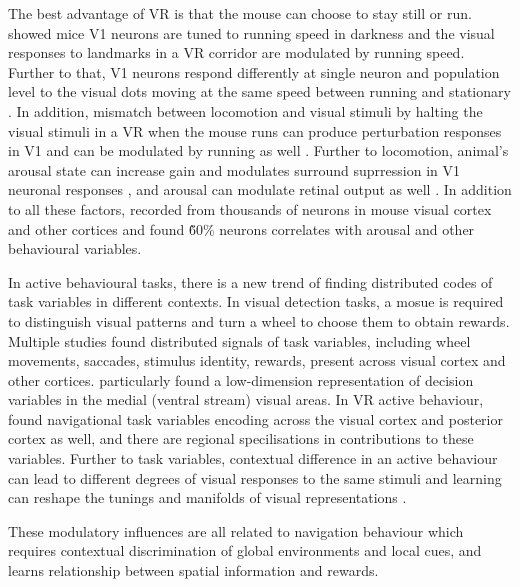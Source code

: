 The best advantage of VR is that the mouse can choose to stay still or run. \cite{saleem_integration_2013} showed mice V1 neurons are tuned to running speed in darkness and the visual responses to landmarks in a VR corridor are modulated by running speed. Further to that, V1 neurons respond differently at single neuron and population level to the visual dots moving at the same speed between running and stationary \cite{horrocks_flexible_2024}. In addition, mismatch between locomotion and visual stimuli by halting the visual stimuli in a VR when the mouse runs can produce perturbation responses in V1 and can be modulated by running as well \cite{muzzu_feature_2021, zmarz_mismatch_2016, keller_sensorimotor_2012}. Further to locomotion, animal's arousal state can increase gain and modulates surround suprression in V1 neuronal responses \cite{ayaz_locomotion_2013, polack_cellular_2013}, and arousal can modulate retinal output as well \cite{schroder_arousal_2020}. In addition to all these factors, \cite{stringer_spontaneous_2019} recorded from thousands of neurons in mouse visual cortex and other cortices and found \~60\% neurons correlates with arousal and other behavioural variables.

In active behavioural tasks, there is a new trend of finding distributed codes of task variables in different contexts. In visual detection tasks, a mosue is required to distinguish visual patterns and turn a wheel to choose them to obtain rewards. Multiple studies \cite{orlandi_distributed_2023, steinmetz_distributed_2019,zatka-haas_sensory_2021} found distributed signals of task variables, including wheel movements, saccades, stimulus identity, rewards, present across visual cortex and other cortices. \cite{orlandi_distributed_2023} particularly found a low-dimension representation of decision variables in the medial (ventral stream) visual areas. In VR active behaviour, \cite{tseng_shared_2022} found navigational task variables encoding across the visual cortex and posterior cortex as well, and there are regional specilisations in contributions to these variables. Further to task variables, contextual difference in an active behaviour can lead to different degrees of visual responses to the same stimuli and learning can reshape the tunings and manifolds of visual representations \cite{hajnal_continuous_2023, faulkner_context_2025, goltstein_mouse_2021}.

These modulatory influences are all related to navigation behaviour which requires contextual discrimination of global environments and local cues, and learns relationship between spatial information and rewards.

